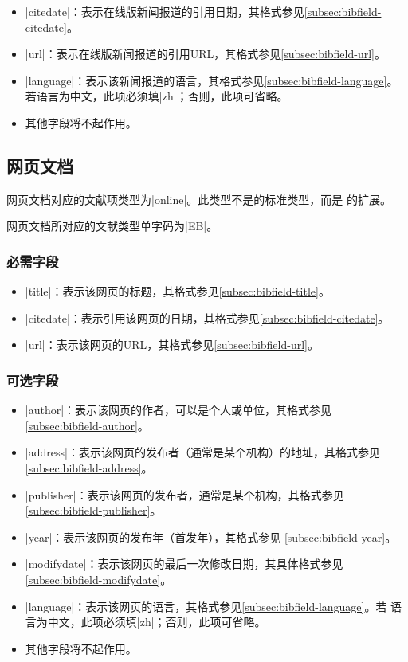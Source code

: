 \begin{itemize}
\item |citedate|：表示在线版新闻报道的引用日期，其格式参见\ref{subsec:bibfield-citedate}。
\item |url|：表示在线版新闻报道的引用URL，其格式参见\ref{subsec:bibfield-url}。
\item |language|：表示该新闻报道的语言，其格式参见\ref{subsec:bibfield-language}。
  若语言为中文，此项必须填|zh|；否则，此项可省略。
\item 其他字段将不起作用。
\end{itemize}

\subsection{网页文档}\label{subsec:bibtype-online}

网页文档对应的{\BibTeX}文献项类型为|online|。此类型不是{\BibTeX}的标准类型，而是
{\njuthesis}的扩展。

网页文档所对应的文献类型\cite{gbt3469-1983}单字码为|EB|。

\subsubsection{必需字段}

\begin{itemize}
\item |title|：表示该网页的标题，其格式参见\ref{subsec:bibfield-title}。
\item |citedate|：表示引用该网页的日期，其格式参见\ref{subsec:bibfield-citedate}。
\item |url|：表示该网页的URL，其格式参见\ref{subsec:bibfield-url}。
\end{itemize}

\subsubsection{可选字段}

\begin{itemize}
\item |author|：表示该网页的作者，可以是个人或单位，其格式参见
  \ref{subsec:bibfield-author}。
\item |address|：表示该网页的发布者（通常是某个机构）的地址，其格式参见
  \ref{subsec:bibfield-address}。
\item |publisher|：表示该网页的发布者，通常是某个机构，其格式参见
  \ref{subsec:bibfield-publisher}。
\item |year|：表示该网页的发布年（首发年），其格式参见
  \ref{subsec:bibfield-year}。
\item |modifydate|：表示该网页的最后一次修改日期，其具体格式参见
  \ref{subsec:bibfield-modifydate}。
\item |language|：表示该网页的语言，其格式参见\ref{subsec:bibfield-language}。若
  语言为中文，此项必须填|zh|；否则，此项可省略。
\item 其他字段将不起作用。
\end{itemize}

